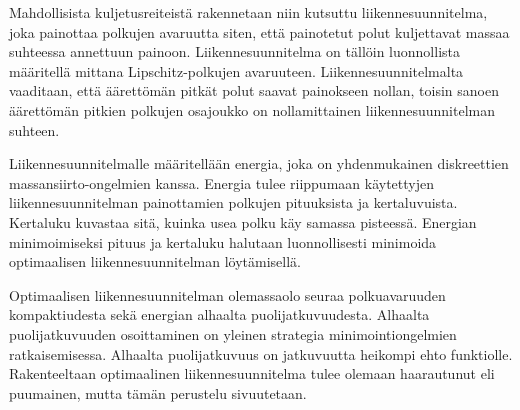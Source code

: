 Mahdollisista kuljetusreiteistä rakennetaan niin kutsuttu liikennesuunnitelma, joka painottaa polkujen avaruutta siten, että painotetut polut kuljettavat massaa suhteessa annettuun painoon. Liikennesuunnitelma on tällöin luonnollista määritellä mittana Lipschitz-polkujen avaruuteen. Liikennesuunnitelmalta vaaditaan, että äärettömän pitkät polut saavat painokseen nollan, toisin sanoen äärettömän pitkien polkujen osajoukko on nollamittainen liikennesuunnitelman suhteen.


Liikennesuunnitelmalle määritellään energia, joka on yhdenmukainen diskreettien massansiirto-ongelmien kanssa. Energia tulee riippumaan käytettyjen liikennesuunnitelman painottamien polkujen pituuksista ja kertaluvuista. Kertaluku kuvastaa sitä, kuinka usea polku käy samassa pisteessä. Energian minimoimiseksi pituus ja kertaluku halutaan luonnollisesti minimoida optimaalisen liikennesuunnitelman löytämisellä.

Optimaalisen liikennesuunnitelman olemassaolo seuraa polkuavaruuden kompaktiudesta sekä energian alhaalta puolijatkuvuudesta. Alhaalta puolijatkuvuuden osoittaminen on yleinen strategia minimointiongelmien ratkaisemisessa. Alhaalta puolijatkuvuus on jatkuvuutta heikompi ehto funktiolle. Rakenteeltaan optimaalinen liikennesuunnitelma tulee olemaan haarautunut eli puumainen, mutta tämän perustelu sivuutetaan.






\newpage
\setcounter{tocdepth}{1}

\thispagestyle{empty}
\tableofcontents

\thispagestyle{empty}
\mainmatter


